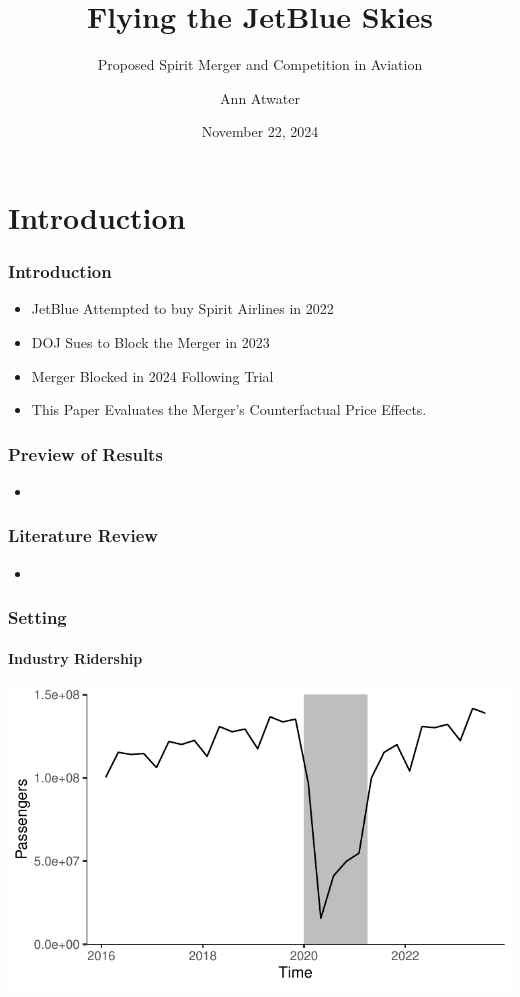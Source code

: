 \documentclass[xcolor=dvipsnames]{beamer}
\author{Ann Atwater}
\institute{University of Florida}
\title{Flying the JetBlue Skies}
\subtitle{Proposed Spirit Merger and Competition in Aviation}
\date{November 22, 2024}
\begin{document}
	\section{Introduction}
	\frame{\titlepage}
		
	\begin{frame}
		\frametitle{Introduction}
		\begin{itemize}
			\item JetBlue Attempted to buy Spirit Airlines in 2022
			\item DOJ Sues to Block the Merger in 2023
			\item Merger Blocked in 2024 Following Trial 
			\item This Paper Evaluates the Merger's Counterfactual Price Effects. 
		\end{itemize}
	\end{frame}
	
	\begin{frame}
		\frametitle{Preview of Results}
		\begin{itemize}
			\item 
		\end{itemize}
	\end{frame}
	
	\begin{frame}
		\frametitle{Literature Review}
		\begin{itemize}
			\item 
		\end{itemize}
	\end{frame}
		
	\begin{frame}
		\frametitle{Setting}
		\framesubtitle{Industry Ridership}
		\includegraphics[width = \textwidth]{Quarterly_DB1B_Itineraries}
	\end{frame}
		
\end{document}
